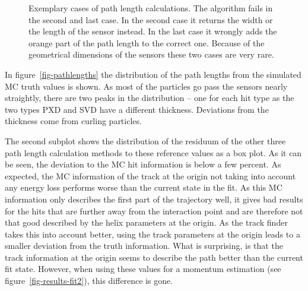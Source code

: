 \begin{figure}
  \caption[Exemplary cases of path length calculations.]{Exemplary cases of path length calculations. The algorithm fails in the second and last case. In the second case it returns the width or the length of the sensor instead. In the last case it wrongly adds the orange part of the path length to the correct one. Because of the geometrical dimensions of the sensors these two cases are very rare.}
  \label{fig-errors-in-path-length}
\end{figure}

In figure~\ref{fig-pathlengths} the distribution of the path lengths from the simulated MC truth values is shown. As most of the particles go pass the sensors nearly straightly, there are two peaks in the distribution -- one for each hit type as the two types PXD and SVD have a different thickness. Deviations from the thickness come from curling particles.

The second subplot shows the distribution of the residuum of the other three path length calculation methods to these reference values as a box plot. As it can be seen, the deviation to the MC hit information is below a few percent. As expected, the MC information of the track at the origin not taking into account any energy loss performs worse than the current state in the fit. As this MC information only describes the first part of the trajectory well, it gives bad results for the hits that are further away from the interaction point and are therefore not that good described by the helix parameters at the origin. As the track finder takes this into account better, using the track parameters at the origin leads to a smaller deviation from the truth information. What is surprising, is that the track information at the origin seems to describe the path better than the current fit state. However, when using these values for a momentum estimation (see figure~\ref{fig-results-fit2}), this difference is gone.


